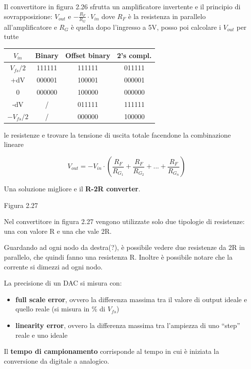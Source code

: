 \documentclass[
]{article}
\providecommand{\tightlist}{%
  \setlength{\itemsep}{0pt}\setlength{\parskip}{0pt}}
\begin{document}
Il convertitore in figura 2.26 sfrutta un amplificatore invertente e il
principio di sovrapposizione: \(V_{out}\) e
\(-\frac{R_{F}}{R_{G}}\cdot V_{in}\) dove \(R_{F}\) è la resistenza in
parallelo all'amplificatore e \(R_{G}\) è quella dopo l'ingresso a 5V,
posso poi calcolare i \(V_{out}\) per tutte

\begin{center}
\begin{table} \begin{tabular}{c|c|c|c} $V_{in}$ & Binary & Offset binary & 2's compl. \\
\hline $V_{fs}/2$ & 111111 & 111111 & 011111 \\ +dV & 000001 & 100001 & 000001 \\ 0 & 000000
& 100000 & 000000 \\ -dV & / & 011111 & 111111 \\ $-V_{fs}/2$ & / & 000000 & 100000 \\
\end{tabular} \end{table}
\end{center}

le resistenze e trovare la tensione di uscita totale facendone la
combinazione lineare

\[V_{out}=-V_{in}\cdot\left(\frac{R_{F}}{R_{G_{1}}}+\frac{R_{F}}{R_{G_{2}}}+...+
\frac{R_{F}}{R_{G_{n}}}\right)\]

Una soluzione migliore e il \textbf{R-2R converter}.

Figura 2.27

Nel convertitore in figura 2.27 vengono utilizzate solo due tipologie di
resistenze: una con valore R e una che vale 2R.

Guardando ad ogni nodo da destra(?), è possibile vedere due resistenze
da 2R in parallelo, che quindi fanno una resistenza R. Inoltre è
possibile notare che la corrente si dimezzi ad ogni nodo.

La precisione di un DAC si misura con:

\begin{itemize}
\tightlist
\item
  \textbf{full scale error}, ovvero la differenza massima tra il valore
  di output ideale e quello reale (si misura in \% di \(V_{fs}\))
\item
  \textbf{linearity error}, ovvero la differenza massima tra l'ampiezza
  di uno ``step'' reale e uno ideale
\end{itemize}

Il \textbf{tempo di campionamento} corrisponde al tempo in cui è
iniziata la conversione da digitale a analogico.
\end{document}
